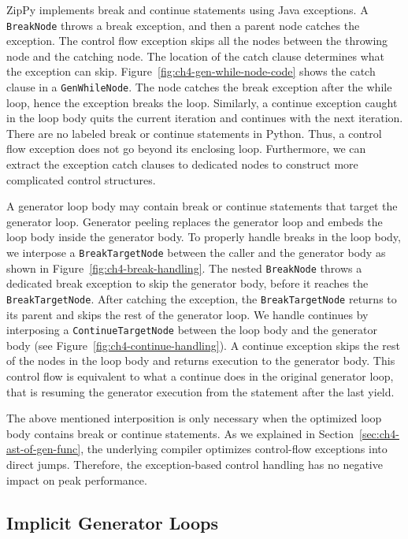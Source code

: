 ZipPy implements break and continue statements using Java exceptions.
A \texttt{BreakNode} throws a break exception, and then a parent node catches the exception.
The control flow exception skips all the nodes between the throwing node and the catching node.
The location of the catch clause determines what the exception can skip.
Figure~\ref{fig:ch4-gen-while-node-code} shows the catch clause in a \texttt{GenWhileNode}.
The node catches the break exception after the while loop, hence the exception breaks the loop.
Similarly, a continue exception caught in the loop body quits the current iteration and continues with the next iteration.
There are no labeled break or continue statements in Python.
Thus, a control flow exception does not go beyond its enclosing loop.
Furthermore, we can extract the exception catch clauses to dedicated nodes to construct more complicated control structures.

A generator loop body may contain break or continue statements that target the generator loop.
Generator peeling replaces the generator loop and embeds the loop body inside the generator body.
To properly handle breaks in the loop body, we interpose a \texttt{BreakTargetNode} between the caller and the generator body as shown in Figure~\ref{fig:ch4-break-handling}.
The nested \texttt{BreakNode} throws a dedicated break exception to skip the generator body, before it reaches the \texttt{BreakTargetNode}.
After catching the exception, the \texttt{BreakTargetNode} returns to its parent and skips the rest of the generator loop.
We handle continues by interposing a \texttt{ContinueTargetNode} between the loop body and the generator body (see Figure~\ref{fig:ch4-continue-handling}).
A continue exception skips the rest of the nodes in the loop body and returns execution to the generator body.
This control flow is equivalent to what a continue does in the original generator loop, that is resuming the generator execution from the statement after the last yield.

The above mentioned interposition is only necessary when the optimized loop body contains break or continue statements.
As we explained in Section~\ref{sec:ch4-ast-of-gen-func}, the underlying compiler optimizes control-flow exceptions into direct jumps.
Therefore, the exception-based control handling has no negative impact on peak performance.

\subsection{Implicit Generator Loops}

